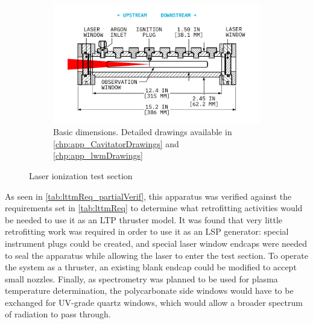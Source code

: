 \begin{figure}[h]
\begin{subfigure}[t]{0.49\textwidth}
                    \label{fig:cavitation_photo}
                \end{subfigure}
                \begin{subfigure}[t]{\textwidth}
                    \centering
                    \includegraphics[]{assets/3 design/testsection_layout.pdf}
                    \caption{Basic dimensions. Detailed drawings available in \autoref{chp:app_CavitatorDrawings} and \autoref{chp:app_lwmDrawings}}
                    \label{fig:cavitation_dimensions}
                \end{subfigure}
                \caption{Laser ionization test section}
                \label{fig:cavitation}
            \end{figure}

            As seen in \autoref{tab:lttmReq_partialVerif}, this apparatus was verified against the requirements set in \autoref{tab:lttmReq} to determine what retrofitting activities would be needed to use it as an LTP thruster model. It was found that very little retrofitting work was required in order to use it as an LSP generator: special instrument plugs could be created, and special laser window endcaps were needed to seal the apparatus while allowing the laser to enter the test section. To operate the system as a thruster, an existing blank endcap could be modified to accept small nozzles. Finally, as spectrometry was planned to be used for plasma temperature determination, the polycarbonate side windows would have to be exchanged for UV-grade quartz windows, which would allow a broader spectrum of radiation to pass through.
        
